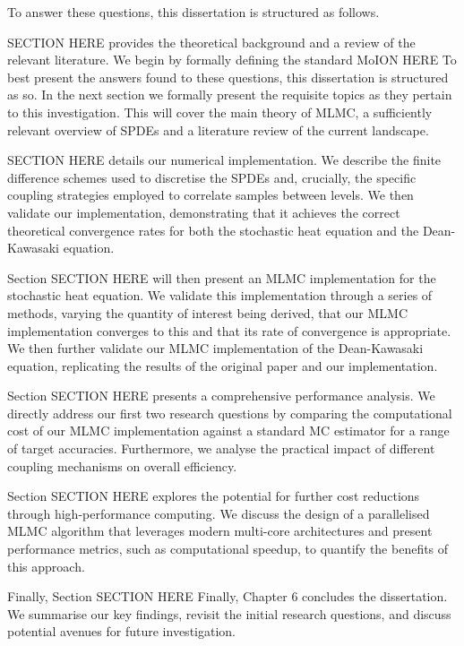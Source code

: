 To answer these questions, this dissertation is structured as follows.

SECTION HERE provides the theoretical background and a review of the 
relevant literature. 
We begin by formally defining the standard MoION HERE 
To best present the answers found to these questions, this dissertation 
is structured as so. In the next section we formally present the requisite 
topics as they pertain to this investigation. This will cover 
the main theory of MLMC, a sufficiently relevant overview of SPDEs and a literature
review of the current landscape.

SECTION HERE details our numerical implementation. We describe the 
finite difference schemes used to discretise the SPDEs and, 
crucially, the specific coupling strategies employed to correlate samples between
levels. We then validate our implementation, demonstrating that it achieves 
the correct theoretical convergence rates for both the stochastic heat equation
and the Dean-Kawasaki equation.

Section SECTION HERE will then present an MLMC implementation for the 
stochastic heat equation. We  validate this implementation through a series of methods, 
varying the quantity of interest being derived, that our MLMC implementation 
converges to this and that its rate of convergence is appropriate. We then 
further validate our MLMC implementation of the Dean-Kawasaki equation, replicating 
the results of the original paper and our implementation.


Section SECTION HERE presents a comprehensive performance analysis. 
We directly address our first two research questions by comparing the 
computational cost of our MLMC implementation against a standard MC 
estimator for a range of target accuracies. Furthermore, we analyse 
the practical impact of different coupling mechanisms on overall efficiency.

Section SECTION HERE explores the potential for further cost reductions 
through high-performance computing. We discuss the design of a parallelised MLMC 
algorithm that leverages modern multi-core architectures and present performance 
metrics, such as computational speedup, to quantify the benefits of this approach.

Finally, Section SECTION HERE 
Finally, Chapter 6 concludes the dissertation. We summarise our key findings, 
revisit the initial research questions, and discuss potential avenues for future investigation.



 
